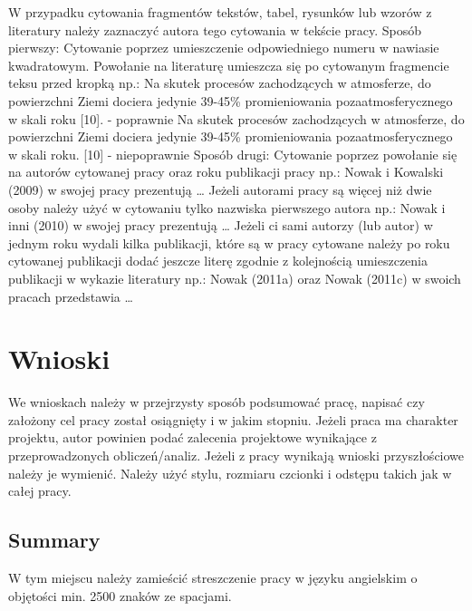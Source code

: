 \documentclass[11pt,a4paper]{article}
\begin{document}
W przypadku cytowania \cite{greenwade93} fragmentów tekstów, tabel, rysunków lub wzorów z literatury należy zaznaczyć autora tego cytowania w tekście pracy.
Sposób pierwszy: Cytowanie poprzez umieszczenie odpowiedniego numeru w nawiasie kwadratowym. Powołanie na literaturę umieszcza się po cytowanym fragmencie teksu przed kropką np.: Na skutek procesów zachodzących w atmosferze, do powierzchni Ziemi dociera jedynie 39-45\% promieniowania pozaatmosferycznego w skali roku [10].  - poprawnie    
Na skutek procesów zachodzących w atmosferze, do powierzchni Ziemi dociera jedynie 39-45\% promieniowania pozaatmosferycznego w skali roku. [10]  - niepoprawnie    
Sposób drugi: Cytowanie poprzez powołanie się na autorów cytowanej pracy oraz roku publikacji pracy np.: Nowak i Kowalski (2009) w swojej pracy prezentują … 
Jeżeli autorami pracy są więcej niż dwie osoby należy użyć w cytowaniu tylko nazwiska pierwszego autora np.: Nowak i inni (2010) w swojej pracy prezentują …
Jeżeli ci sami autorzy (lub autor) w jednym roku wydali kilka publikacji, które są w pracy cytowane należy po roku cytowanej publikacji dodać jeszcze literę zgodnie z kolejnością umieszczenia publikacji w wykazie literatury np.: Nowak (2011a) oraz Nowak (2011c) w swoich pracach przedstawia …

\newpage

\section{Wnioski}

We wnioskach należy w przejrzysty sposób podsumować pracę, napisać czy założony cel pracy został osiągnięty i w jakim stopniu. Jeżeli praca ma charakter projektu, autor powinien podać zalecenia projektowe wynikające z przeprowadzonych obliczeń/analiz. Jeżeli z pracy wynikają wnioski przyszłościowe należy je wymienić. Należy użyć stylu, rozmiaru czcionki i odstępu takich jak w całej pracy.

\newpage




\newpage

\newcommand{\summaryName}{Summary}

\begin{center}
\section*{\Large\textbf{\summaryName}}
\end{center}
\addcontentsline{toc}{section}{\summaryName}

W tym miejscu należy zamieścić streszczenie pracy w języku angielskim o objętości min. 2500 znaków ze spacjami.
\end{document}
